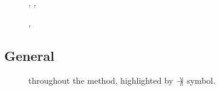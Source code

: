 
\begin{description}
	
	\item [] , , 

\end{description}



\begin{description}
		
	\item [] , 

\end{description}








\subsection{General}

\begin{description}
	\item []
		throughout the method, highlighted by $-\hspace{-0.4em}\rangle\hspace{-0.2em}|$ symbol. %

\end{description}







